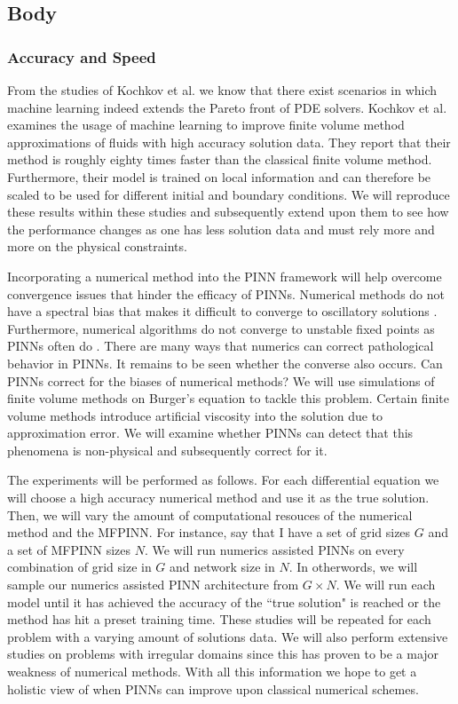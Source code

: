 \documentclass[12pt]{article}
\begin{document}
\subsection{Body}
\subsubsection*{Accuracy and Speed}

From the studies of Kochkov et al. \cite{fluidml} we know that there exist scenarios in which machine learning
indeed extends the Pareto front of PDE solvers. Kochkov et al. \cite{fluidml} examines the usage of machine learning 
to improve finite volume method approximations of fluids with high accuracy solution data. 
They report that their method is roughly eighty times faster than the classical finite volume method.
Furthermore, their model is trained on local information and can therefore be scaled to be used for different initial and boundary conditions.
We will reproduce these results within these studies and subsequently extend upon them to see how the performance changes as one has less solution data
and must rely more and more on the physical constraints.

Incorporating a numerical method into the PINN framework will help overcome convergence issues that hinder the efficacy of PINNs.
Numerical methods do not have a spectral bias that makes it difficult to converge to oscillatory solutions \cite{bias}. Furthermore,
numerical algorithms do not converge to unstable fixed points as PINNs often do \cite{fixedpts}. There are many ways that numerics can 
correct pathological behavior in PINNs. It remains to be seen whether the converse also occurs. Can PINNs correct for the
biases of numerical methods? We will use simulations of finite volume methods on Burger's equation to tackle this problem. Certain finite
volume methods introduce artificial viscosity into the solution due to approximation error. We will examine whether
PINNs can detect that this phenomena is non-physical and subsequently correct for it.

The experiments will be performed as follows. For each differential equation we will choose a high accuracy numerical method and use it
as the true solution. Then, we will vary the amount of computational resouces of the numerical method and the MFPINN. For instance, say
that I have a set of grid sizes $G$ and a set of MFPINN sizes $N$. We will run numerics assisted PINNs on every combination of grid size in $G$ 
and network size in $N$. In otherwords, we will sample our numerics assisted PINN architecture from $G \times N$. We will run each model until it
has achieved the accuracy of the ``true solution" is reached or the method has hit a preset training time. These studies will be repeated for each
problem with a varying amount of solutions data. We will also perform extensive studies on problems with irregular domains since this 
has proven to be a major weakness of numerical methods. With all this information we hope to get a holistic view of when PINNs can improve upon classical
numerical schemes.
\end{document}
